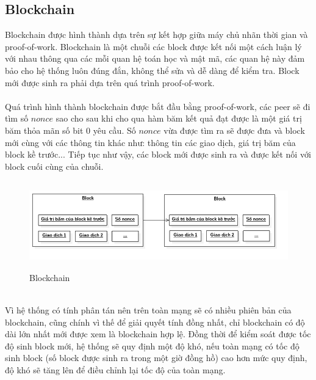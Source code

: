 \subsection{Blockchain}
Blockchain được hình thành dựa trên sự kết hợp giữa máy chủ nhãn thời gian và 
proof-of-work. Blockchain là một chuỗi các block được kết nối một cách luận lý 
với nhau thông qua các mỗi quan hệ toán học và mật mã, các quan hệ này đảm bảo 
cho hệ thống luôn đúng đắn, không thể sửa và dễ dàng để kiểm tra. Block mới được 
sinh ra phải dựa trên quá trình proof-of-work.\\\\
Quá trình hình thành blockchain được bắt đầu bằng proof-of-work, các peer sẽ đi
tìm số $nonce$ sao cho sau khi cho qua hàm băm kết quả đạt được là một giá trị 
băm thỏa mãn số bit 0 yêu cầu. Số $nonce$ vừa được tìm ra sẽ được đưa và block
mới cùng với các thông tin khác như: thông tin các giao dịch, giá trị băm của 
block kề trước... Tiếp tục như vậy, các block mới được sinh ra và được kết nối 
với block cuối cùng của chuỗi.\\
\begin{figure}[h!]
\centering
\includegraphics[height=1.5in, keepaspectratio=true]{blockchain.png}
\caption{Blockchain}
\end{figure}\\
Vì hệ thống có tính phân tán nên trên toàn mạng sẽ có nhiều phiên bản của blockchain,
cũng chính vì thế để giải quyết tính đồng nhất, chỉ blockchain có độ dài lớn 
nhất mới được xem là blockchain hợp lệ. Đồng thời để kiểm soát được tốc độ sinh
block mới, hệ thống sẽ quy định một độ khó, nếu toàn mạng có tốc độ sinh block 
(số block được sinh ra trong một giờ đồng hồ) cao hơn mức quy định, độ khó sẽ tăng lên 
để điều chỉnh lại tốc độ của toàn mạng.
